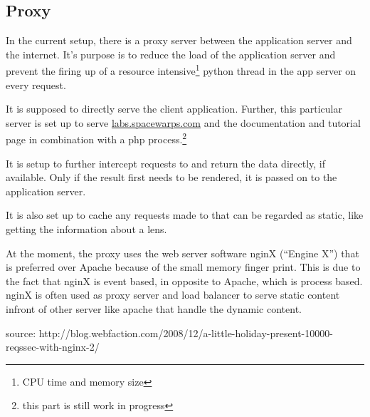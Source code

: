 \subsection{Proxy}
\label{sec:proxy}

In the current setup, there is a proxy server between the application server and the internet.
It's purpose is to reduce the load of the application server and prevent the firing up of a resource intensive\footnote{CPU time and memory size} python thread in the app server on every request.

It is supposed to directly serve the client application. Further, this particular server is set up to serve \url{labs.spacewarps.com} and the \spl documentation and tutorial page in combination with a php process.\footnote{this part is still work in progress}

It is setup to further intercept requests to  and return the data directly, if available.
Only if the result first needs to be rendered, it is passed on to the application server.

It is also set up to cache any requests made to  that can be regarded as static, like getting the information about a lens.

At the moment, the proxy uses the web server software nginX (``Engine X'') that is preferred over Apache because of the small memory finger print.
This is due to the fact that nginX is event based, in opposite to Apache, which is process based.
nginX is often used as proxy server and load balancer to serve static content infront of other server like apache that handle the dynamic content.

source:
http://blog.webfaction.com/2008/12/a-little-holiday-present-10000-reqssec-with-nginx-2/


